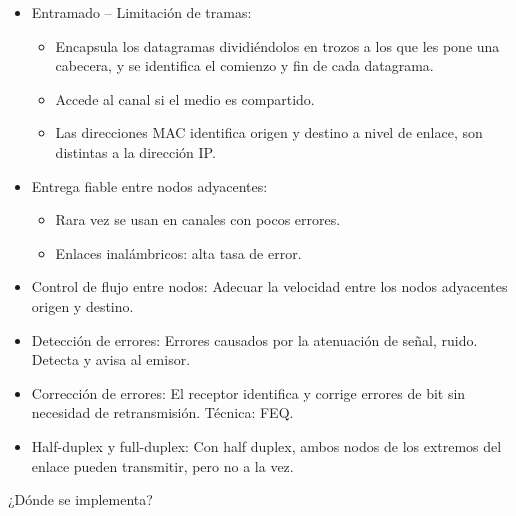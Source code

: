 \documentclass[12pt, twoside, openright]{report} %
\begin{document}
    \begin{itemize}
    \item
      Entramado -- Limitación de tramas:

      \begin{itemize}
      \item
        Encapsula los datagramas dividiéndolos en trozos a los que les
        pone una cabecera, y se identifica el comienzo y fin de cada
        datagrama.
      \item
        Accede al canal si el medio es compartido.
      \item
        Las direcciones MAC identifica origen y destino a nivel de
        enlace, son distintas a la dirección IP.
      \end{itemize}
    \item
      Entrega fiable entre nodos adyacentes:

      \begin{itemize}
      \item
        Rara vez se usan en canales con pocos errores.
      \item
        Enlaces inalámbricos: alta tasa de error.
      \end{itemize}
    \item
      Control de flujo entre nodos: Adecuar la velocidad entre los nodos
      adyacentes origen y destino.
    \item
      Detección de errores: Errores causados por la atenuación de señal,
      ruido. Detecta y avisa al emisor.
    \item
      Corrección de errores: El receptor identifica y corrige errores de
      bit sin necesidad de retransmisión. Técnica: FEQ.
    \item
      Half-duplex y full-duplex: Con half duplex, ambos nodos de los
      extremos del enlace pueden transmitir, pero no a la vez.
    \end{itemize}

    ¿Dónde se implementa?
\end{document}
